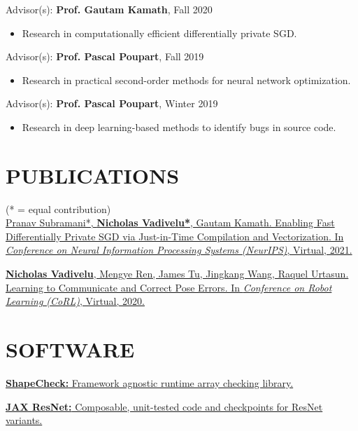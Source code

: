 \documentclass[line,margin]{res}
\newcommand{\ura}[3]{Advisor(s): \textbf{#1}, \textit{#2} \hfill #3 \\ \vspace{-4mm}}
\newcommand{\paper}[6]{\href{#6}{#1. #2. In \textit{#3}, #4, #5.}}
\newcommand{\software}[3]{\href{#3}{\textbf{#1: } #2.}\vspace{-2mm}}
\begin{document}
\begin{resume}
    \ura{Prof. Gautam Kamath}{}{Fall 2020}
    \begin{itemize}
        \item Research in computationally efficient differentially private SGD.
    \end{itemize}
    \vspace{-2mm}

    \ura{Prof. Pascal Poupart}{}{Fall 2019}
    \begin{itemize}
        \item Research in practical second-order methods for neural network optimization.
    \end{itemize}
    \vspace{-2mm}

    \ura{Prof. Pascal Poupart}{}{Winter 2019}
    \begin{itemize}
        \item Research in deep learning-based methods to identify bugs in source code.
    \end{itemize}
    \vspace{-2mm}

\newpage

\section{PUBLICATIONS}
    \small{(* = equal contribution)} \vspace{2mm} \\
    \paper
    {Pranav Subramani*, \textbf{Nicholas Vadivelu*}, Gautam Kamath}
    {Enabling Fast Differentially Private SGD via Just-in-Time Compilation and Vectorization}
    {Conference on Neural Information Processing Systems (NeurIPS)}{Virtual}{2021}
    {https://arxiv.org/abs/2010.09063}

    \paper
    {\textbf{Nicholas Vadivelu}, Mengye Ren, James Tu, Jingkang Wang, Raquel Urtasun}
    {Learning to Communicate and Correct Pose Errors}
    {Conference on Robot Learning (CoRL)}{Virtual}{2020}
    {https://arxiv.org/abs/2011.05289}


\section{SOFTWARE}
    \software{ShapeCheck}{Framework agnostic runtime array checking library}
    {https://github.com/n2cholas/jax-resnet}

    \software
    {JAX ResNet}{Composable, unit-tested code and checkpoints for ResNet variants}
    {https://pypi.org/project/shapecheck/}


\end{resume}
\end{document}
